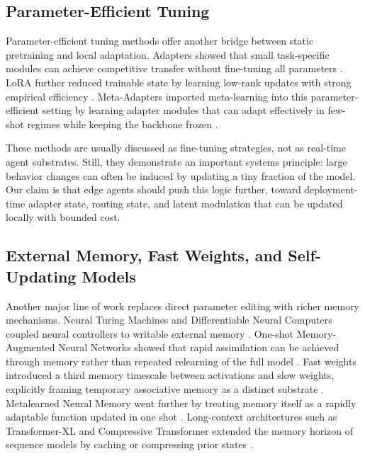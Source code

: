 \documentclass[11pt,a4paper]{article}
\begin{document}
\subsection{Parameter-Efficient Tuning}

Parameter-efficient tuning methods offer another bridge between static pretraining and local adaptation. Adapters showed that small task-specific modules can achieve competitive transfer without fine-tuning all parameters \cite{houlsby2019adapters}. LoRA further reduced trainable state by learning low-rank updates with strong empirical efficiency \cite{hu2021lora}. Meta-Adapters imported meta-learning into this parameter-efficient setting by learning adapter modules that can adapt effectively in few-shot regimes while keeping the backbone frozen \cite{bansal2022metaadapters}.

These methods are usually discussed as fine-tuning strategies, not as real-time agent substrates. Still, they demonstrate an important systems principle: large behavior changes can often be induced by updating a tiny fraction of the model. Our claim is that edge agents should push this logic further, toward deployment-time adapter state, routing state, and latent modulation that can be updated locally with bounded cost.

\subsection{External Memory, Fast Weights, and Self-Updating Models}

Another major line of work replaces direct parameter editing with richer memory mechanisms. Neural Turing Machines and Differentiable Neural Computers coupled neural controllers to writable external memory \cite{graves2014ntm, graves2016dnc}. One-shot Memory-Augmented Neural Networks showed that rapid assimilation can be achieved through memory rather than repeated relearning of the full model \cite{santoro2016mann}. Fast weights introduced a third memory timescale between activations and slow weights, explicitly framing temporary associative memory as a distinct substrate \cite{ba2016fastweights}. Metalearned Neural Memory went further by treating memory itself as a rapidly adaptable function updated in one shot \cite{munkhdalai2019mnm}. Long-context architectures such as Transformer-XL and Compressive Transformer extended the memory horizon of sequence models by caching or compressing prior states \cite{dai2019transformerxl, rae2019compressive}.
\end{document}
